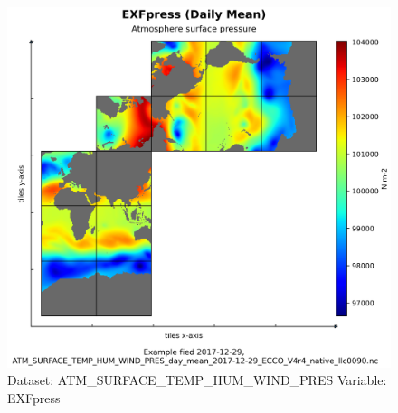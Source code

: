 \begin{figure}[H]
\centering
\includegraphics[width=\textwidth]{../images/plots/native_plots/Atmosphere_Surface_Temperature_Humidity_Wind_and_Pressure/EXFpress.png}
\caption{Dataset: ATM\_SURFACE\_TEMP\_HUM\_WIND\_PRES Variable: EXFpress}
\label{tab:table-ATM_SURFACE_TEMP_HUM_WIND_PRES_EXFpress-Plot}
\end{figure}
\pagebreak
